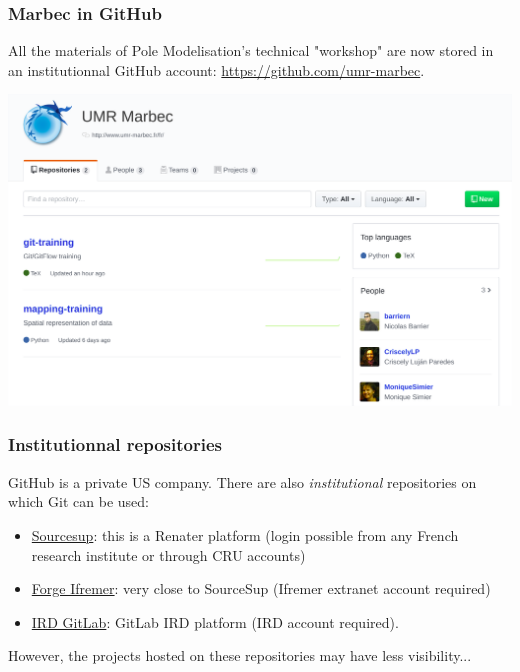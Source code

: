 \documentclass[svgnames]{beamer}
\begin{document}
\begin{frame}
\frametitle{Marbec in GitHub}

    All the materials of Pole Modelisation's technical "workshop" are now stored in an institutionnal GitHub account: \url{https://github.com/umr-marbec}.

\begin{center}
\includegraphics[scale=0.2]{img/github_marbec.png}
\end{center}  
\end{frame}

\begin{frame}
    \frametitle{Institutionnal repositories}

    GitHub is a private US company. There are also \emph{institutional} repositories on which Git can be used:

    \begin{itemize}
        \item{\href{https://sourcesup.renater.fr/}{Sourcesup}: this is a Renater platform (login possible from any French research institute or through CRU accounts)}
        \item{\href{https://forge.ifremer.fr/}{Forge Ifremer}: very close to SourceSup (Ifremer extranet account required)}
        \item{\href{gitlab.intranet.ird.fr}{IRD GitLab}: GitLab IRD platform (IRD account required).}
    \end{itemize}

    However, the projects hosted on these repositories may have less visibility...

\end{frame}
\end{document}
